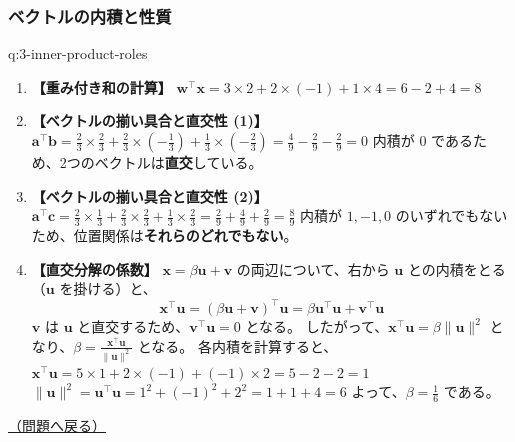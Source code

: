 \documentclass[
  pandoc]{bxjsarticle}
\providecommand{\tightlist}{%
  \setlength{\itemsep}{0pt}\setlength{\parskip}{0pt}}
\begin{document}
\subsubsection{ベクトルの内積と性質}\label{ux30d9ux30afux30c8ux30ebux306eux5185ux7a4dux3068ux6027ux8cea-1}

\begin{answerbox}[phantomlabel=a:3-inner-product-roles]{q:3-inner-product-roles}

\begin{enumerate}
\def\labelenumi{\arabic{enumi}.}
\tightlist
\item
  \textbf{【重み付き和の計算】}
  \(\mathbf{w}^\top \mathbf{x} = 3 \times 2 + 2 \times (-1) + 1 \times 4 = 6 - 2 + 4 = 8\)
\item
  \textbf{【ベクトルの揃い具合と直交性 (1)】}
  \(\mathbf{a}^\top \mathbf{b} = \frac{2}{3} \times \frac{2}{3} + \frac{2}{3} \times \left(-\frac{1}{3}\right) + \frac{1}{3} \times \left(-\frac{2}{3}\right) = \frac{4}{9} - \frac{2}{9} - \frac{2}{9} = 0\)
  内積が \(0\) であるため、2つのベクトルは\textbf{直交}している。
\item
  \textbf{【ベクトルの揃い具合と直交性 (2)】}
  \(\mathbf{a}^\top \mathbf{c} = \frac{2}{3} \times \frac{1}{3} + \frac{2}{3} \times \frac{2}{3} + \frac{1}{3} \times \frac{2}{3} = \frac{2}{9} + \frac{4}{9} + \frac{2}{9} = \frac{8}{9}\)
  内積が \(1, -1, 0\)
  のいずれでもないため、位置関係は\textbf{それらのどれでもない}。
\item
  \textbf{【直交分解の係数】}
  \(\mathbf{x} = \beta \mathbf{u} + \mathbf{v}\) の両辺について、右から
  \(\mathbf{u}\) との内積をとる（\(\mathbf{u}\) を掛ける）と、
  \[ \mathbf{x}^\top \mathbf{u} = (\beta \mathbf{u} + \mathbf{v})^\top \mathbf{u} = \beta \mathbf{u}^\top \mathbf{u} + \mathbf{v}^\top \mathbf{u} \]
  \(\mathbf{v}\) は \(\mathbf{u}\)
  と直交するため、\(\mathbf{v}^\top \mathbf{u} = 0\) となる。
  したがって、\(\mathbf{x}^\top \mathbf{u} = \beta \|\mathbf{u}\|^2\)
  となり、\(\beta = \frac{\mathbf{x}^\top \mathbf{u}}{\|\mathbf{u}\|^2}\)
  となる。 各内積を計算すると、
  \(\mathbf{x}^\top \mathbf{u} = 5 \times 1 + 2 \times (-1) + (-1) \times 2 = 5 - 2 - 2 = 1\)
  \(\|\mathbf{u}\|^2 = \mathbf{u}^\top \mathbf{u} = 1^2 + (-1)^2 + 2^2 = 1 + 1 + 4 = 6\)
  よって、\(\beta = \frac{1}{6}\) である。
\end{enumerate}

\hfill 

\hyperref[q:3-inner-product-roles]{（問題へ戻る）}

\end{answerbox}
\end{document}
